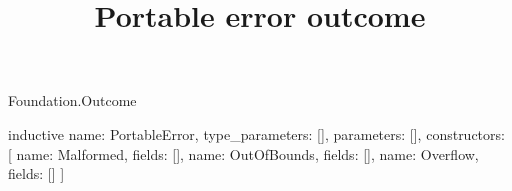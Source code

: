 \begin{lexlean}{Foundation.Outcome}
\title{Portable error outcome}
\begin{semanticmodule}
inductive{
  name: PortableError,
  type_parameters: [],
  parameters: [],
  constructors: [
    {name: Malformed, fields: []},
    {name: OutOfBounds, fields: []},
    {name: Overflow, fields: []}
  ]
}
\end{semanticmodule}
\end{lexlean}
